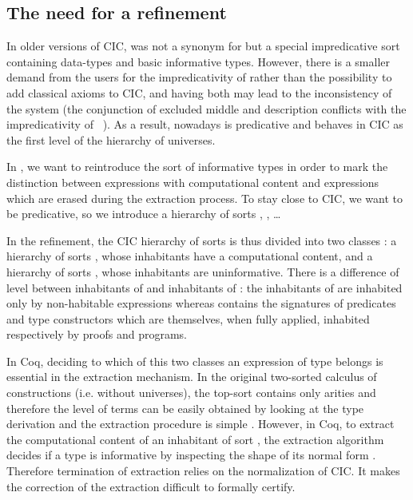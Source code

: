 \documentclass[a4paper,USenglish]{lipics}
\def\coq{\textsf{Coq}\xspace}
\def\cic{\textsf{CIC}\xspace}
\def\cicr{\xspace}
\begin{document}
\subsection{The need for a refinement}

In older versions of \cic,  was not a synonym for  but a
special impredicative sort containing data-types and basic informative
types. However, there is a smaller demand from the users for the
impredicativity of  rather than the possibility to add classical
axioms to \cic, and having both may lead to the inconsistency of the
system (the conjunction of excluded middle and description conflicts with
the impredicativity of ~\cite{Geuvers01}). As a result, nowadays 
is predicative and behaves in \cic as the first level of the hierarchy of
universes.

In \cicr, we want to reintroduce the sort  of
informative types in order to mark the distinction between
expressions with computational content and expressions
which are erased during the extraction process. To stay close to \cic, we
want  to be predicative, so we introduce a hierarchy of
sorts , , \dots

In the refinement, the \cic hierarchy of sorts  is thus divided
into two classes : a hierarchy of sorts , whose inhabitants have a
  computational content, and a hierarchy of sorts , whose inhabitants are uninformative.
There is a difference of level between inhabitants
of  and inhabitants of :
the inhabitants of  are inhabited only by non-habitable expressions
whereas  contains the
signatures of predicates and type constructors which are
themselves, when fully applied, inhabited respectively by proofs and
programs.

In \coq, deciding to which of this two classes an expression of type
 belongs is essential in the extraction mechanism.  In the original
two-sorted calculus of constructions (i.e. without universes), the
top-sort contains only arities and therefore the level of terms can be easily
obtained by looking at the type derivation and the extraction procedure is
simple \cite{DBLP:conf/popl/Paulin-Mohring89}. However, in \coq, to extract the
computational content of an inhabitant of sort , the extraction
algorithm decides if a type is informative by inspecting the shape of its
normal form \cite{letouzey04, DBLP:conf/cie/Letouzey08}.
Therefore termination of extraction relies on the normalization of
\cic. It makes the correction of the extraction difficult to formally certify.
\end{document}
